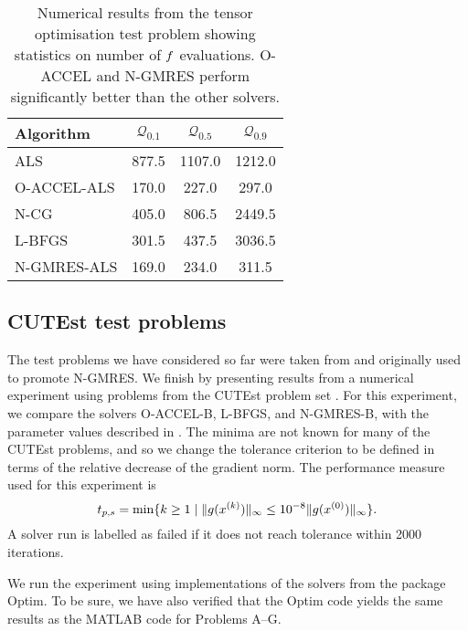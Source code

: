 \documentclass[main.tex]{subfiles}
\begin{document}
\begin{table}[hbtp]
  \centering
  \begin{tabular}{lS[table-auto-round,table-format=4]
    S[table-auto-round,table-format=4]
    S[table-auto-round,table-format=4]}
    \toprule
    Algorithm&{$\mathcal{Q}_{0.1}$}&{$\mathcal{Q}_{0.5}$}&{$\mathcal{Q}_{0.9}$}\\
    \midrule
    ALS&877.5&1107.0&1212.0\\
    O-ACCEL-ALS&170.0&227.0&297.0\\
    N-CG&405.0&806.5&2449.5\\
    L-BFGS&301.5&437.5&3036.5\\
    N-GMRES-ALS&169.0&234.0&311.5\\
    \bottomrule
  \end{tabular}
  \caption[Numerical results from the tensor optimisation test problem]{Numerical results from the tensor optimisation test
    problem showing statistics on number of $f$ evaluations. O-ACCEL and N-GMRES perform significantly better than the
    other solvers.}\label{tbl:quantiles_tensor_cp_all}
\end{table}


\subsection{CUTEst test problems}
The test problems we have considered so far were taken from
\citet{sterck2013steepest} and originally used to promote N-GMRES. We
finish by presenting results from a numerical experiment using
problems from the CUTEst problem set \citep{gould2015cutest}.  For this
experiment, we compare the solvers O-ACCEL-B, L-BFGS, and N-GMRES-B,
with the parameter values described in
.  The minima are not known for many of
the CUTEst problems, and so we change the tolerance criterion to be
defined in terms of the relative decrease of the gradient norm.  The
performance measure used for this experiment is
\begin{equation}\label{eq:def_performance_measure_cutest}
  t_{p,s} = \min\{k\geq 1 \mid \|g(x^{(k)})\|_\infty \leq 10^{-8}\|g(x^{(0)})\|_\infty\}.
\end{equation}
A solver run is labelled as failed if it does not reach tolerance
within \num{2000} iterations.

We run the experiment using implementations of the solvers from the
package Optim. To be sure, we have also verified
that the Optim code yields the same results as the MATLAB code for
Problems A--G.
\end{document}
